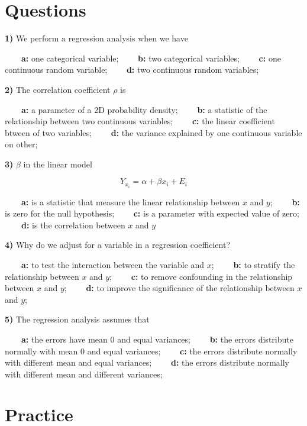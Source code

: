 \documentclass[
]{book}
\begin{document}
\hypertarget{questions-14}{%
\section{Questions}\label{questions-14}}

\textbf{1)} We perform a regression analysis when we have

\textbf{\(\qquad\)a:} one categorical variable;
\textbf{\(\qquad\)b:} two categorical variables;
\textbf{\(\qquad\)c:} one continuous random variable;
\textbf{\(\qquad\)d:} two continuous random variables;

\textbf{2)} The correlation coefficient \(\rho\) is

\textbf{\(\qquad\)a:} a parameter of a 2D probability density;
\textbf{\(\qquad\)b:} a statistic of the relationship between two continuous variables;
\textbf{\(\qquad\)c:} the linear coefficient btween of two variables;
\textbf{\(\qquad\)d:} the variance explained by one continuous variable on other;

\textbf{3)} \(\beta\) in the linear model

\[Y_{x_i} = \alpha + \beta x_i +E_{i}\]

\textbf{\(\qquad\)a:} is a statistic that measure the linear relationship between \(x\) and \(y\);
\textbf{\(\qquad\)b:} is zero for the null hypothesis;
\textbf{\(\qquad\)c:} is a parameter with expected value of zero;
\textbf{\(\qquad\)d:} is the correlation between \(x\) and \(y\)

\textbf{4)} Why do we adjust for a variable in a regression coefficient?

\textbf{\(\qquad\)a:} to test the interaction between the variable and \(x\);
\textbf{\(\qquad\)b:} to stratify the relationship between \(x\) and \(y\);
\textbf{\(\qquad\)c:} to remove confounding in the relationship between \(x\) and \(y\);
\textbf{\(\qquad\)d:} to improve the significance of the relationship between \(x\) and \(y\);

\textbf{5)} The regression analysis assumes that

\textbf{\(\qquad\)a:} the errors have mean 0 and equal variances;
\textbf{\(\qquad\)b:} the errors distribute normally with mean 0 and equal variances;
\textbf{\(\qquad\)c:} the errors distribute normally with different mean and equal variances;
\textbf{\(\qquad\)d:} the errors distribute normally with different mean and different variances;

\hypertarget{practice-8}{%
\section{Practice}\label{practice-8}}
\end{document}
